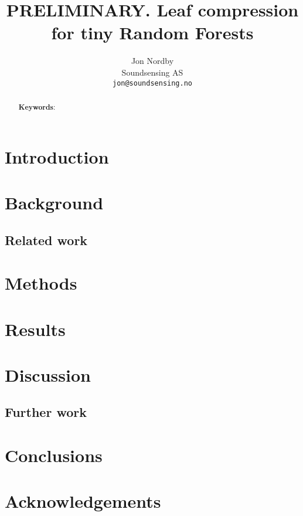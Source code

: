 \documentclass{article}
\begin{document}
\title{PRELIMINARY. Leaf compression for tiny Random Forests}

\author{
    Jon Nordby \\
	Soundsensing AS \\
	\texttt{jon@soundsensing.no} \\	
}

\date{}

\maketitle
\renewcommand{\abstractname}{\vspace{-\baselineskip}} %

\begin{abstract}	\noindent

\noindent \textbf{Keywords}: 

\end{abstract}


\section{Introduction}


\noindent

\newpage
\section{Background}


\subsection{Related work}


\section{Methods}


\newpage
\section{Results}


\section{Discussion}

\subsection{Further work}

\section{Conclusions}


\section*{Acknowledgements}
\noindent


\newpage

 
\end{document}
